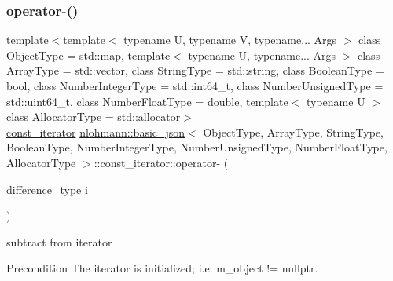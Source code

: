 \subsubsection{\texorpdfstring{operator-\/()}{operator-()}\hspace{0.1cm}{\footnotesize\ttfamily [1/2]}}
{\footnotesize\ttfamily template$<$template$<$ typename U, typename V, typename... Args $>$ class Object\+Type = std\+::map, template$<$ typename U, typename... Args $>$ class Array\+Type = std\+::vector, class String\+Type  = std\+::string, class Boolean\+Type  = bool, class Number\+Integer\+Type  = std\+::int64\+\_\+t, class Number\+Unsigned\+Type  = std\+::uint64\+\_\+t, class Number\+Float\+Type  = double, template$<$ typename U $>$ class Allocator\+Type = std\+::allocator$>$ \\
\hyperlink{classnlohmann_1_1basic__json_1_1const__iterator}{const\+\_\+iterator} \hyperlink{classnlohmann_1_1basic__json}{nlohmann\+::basic\+\_\+json}$<$ Object\+Type, Array\+Type, String\+Type, Boolean\+Type, Number\+Integer\+Type, Number\+Unsigned\+Type, Number\+Float\+Type, Allocator\+Type $>$\+::const\+\_\+iterator\+::operator-\/ (\begin{DoxyParamCaption}\item[{\hyperlink{classnlohmann_1_1basic__json_1_1const__iterator_a49d7c3e9ef3280df03052cce988b792f}{difference\+\_\+type}}]{i }\end{DoxyParamCaption})\hspace{0.3cm}{\ttfamily [inline]}}



subtract from iterator 

\begin{DoxyPrecond}{Precondition}
The iterator is initialized; i.\+e. {\ttfamily m\+\_\+object != nullptr}. 
\end{DoxyPrecond}
\hypertarget{classnlohmann_1_1basic__json_1_1const__iterator_af3ef241a9e26398ea0cf45026287c2ed}{}\label{classnlohmann_1_1basic__json_1_1const__iterator_af3ef241a9e26398ea0cf45026287c2ed} 
